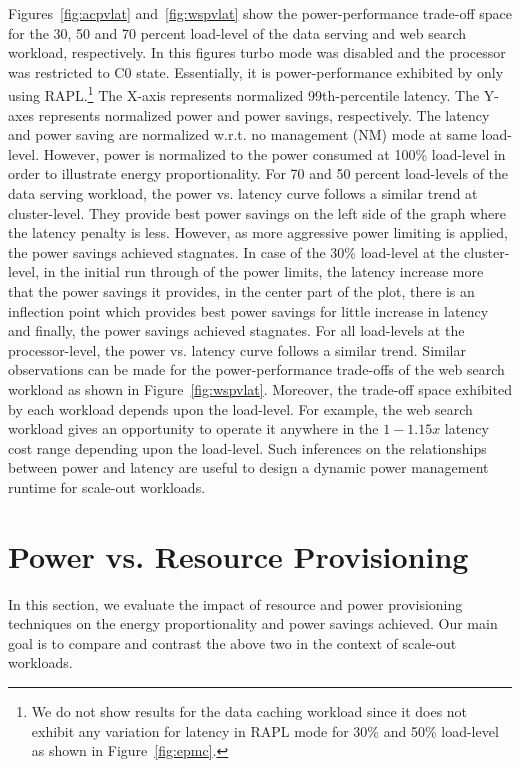 \documentclass{sig-alternate}
\begin{document}
Figures~\ref{fig:acpvlat} and~\ref{fig:wspvlat} show the power-performance trade-off space for 
the 30, 50 and 70 percent load-level of the data serving and web search workload, respectively.
In this figures turbo mode was disabled and the processor was restricted to C0 state. Essentially, it is 
power-performance exhibited by only using RAPL.\footnote{We do not show results for the data caching 
workload since it does not exhibit any variation for latency in RAPL mode for 30\% and 50\% load-level 
as shown in Figure~\ref{fig:epmc}.} The X-axis represents normalized 99th-percentile latency. 
The Y-axes represents normalized power and power savings, respectively. 
The latency and power saving are normalized 
w.r.t. no management (NM) mode at same load-level. However, power is normalized to the 
power consumed at 100\% load-level in order to illustrate energy proportionality. 
For 70 and 50 percent load-levels of the data serving workload, the power vs. latency 
curve follows a similar trend at cluster-level. They provide best power savings on the left side of the graph 
where the latency penalty is less. However, as more aggressive power limiting is applied, the 
power savings achieved stagnates. In case of the 30\% load-level at the cluster-level, in the initial run through of the 
power limits, the latency increase more that the power savings it provides, in the center part of the plot, 
there is an inflection point which provides best power savings for little increase in latency and finally, 
the power savings achieved stagnates. For all load-levels at the processor-level, the power vs. latency curve 
follows a similar trend. Similar observations can be made for the power-performance trade-offs 
of the web search workload as shown in Figure~\ref{fig:wspvlat}. 
Moreover, the trade-off space exhibited by each workload depends upon the load-level. For example, the web search 
workload gives an opportunity to operate it anywhere in the $1-1.15x$ latency cost 
range depending upon the load-level. 
Such inferences on the relationships between power and latency are useful to design a 
dynamic power management runtime for scale-out workloads. 
 \section{Power vs. Resource Provisioning}
\label{sec:ppvrp}

In this section, we evaluate the impact of resource and power provisioning 
techniques on the energy proportionality and power savings achieved. Our main goal is 
to compare and contrast the above two in the context of scale-out workloads. 
\end{document}
